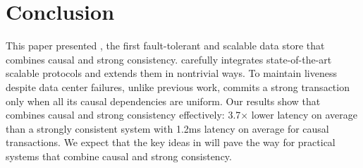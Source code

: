 \section{Conclusion}

This paper presented \System, the first fault-tolerant and
scalable data store that combines causal and strong
consistency. \System carefully integrates state-of-the-art scalable protocols and extends
them in nontrivial ways. To maintain liveness despite data
center failures, unlike previous work, \System commits a strong transaction only when all its
causal dependencies are uniform. Our results show that
\System combines causal and strong
consistency effectively: 3.7$\times$
lower latency on average than a strongly consistent system with 1.2ms
latency on average for causal transactions.
We expect that the key ideas in \System will pave
the way for practical systems that combine causal and strong
consistency.

